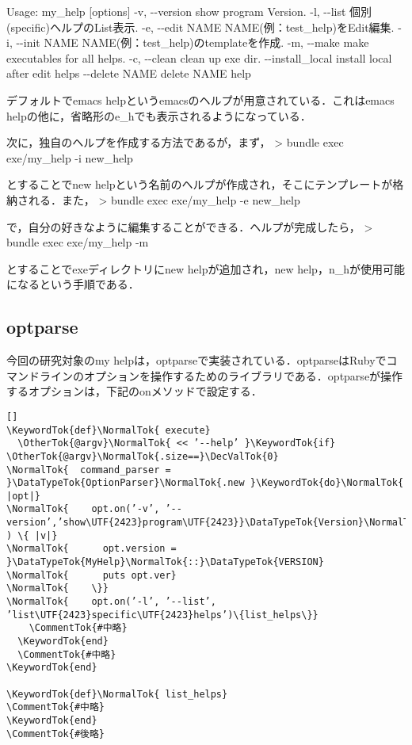 \documentclass[11pt,dvipdfmx]{jsarticle}
\newcommand{\KeywordTok}[1]{\textcolor[rgb]{0.00,0.44,0.13}{\textbf{{#1}}}}
\newcommand{\DataTypeTok}[1]{\textcolor[rgb]{0.56,0.13,0.00}{{#1}}}
\newcommand{\DecValTok}[1]{\textcolor[rgb]{0.25,0.63,0.44}{{#1}}}
\newcommand{\CommentTok}[1]{\textcolor[rgb]{0.38,0.63,0.69}{\textit{{#1}}}}
\newcommand{\OtherTok}[1]{\textcolor[rgb]{0.00,0.44,0.13}{{#1}}}
\newcommand{\NormalTok}[1]{{#1}}
\begin{document}
Usage: my\_help {[}options{]} -v, -\/-version show program Version. -l,
-\/-list 個別(specific)ヘルプのList表示. -e, -\/-edit NAME
NAME(例：test\_help)をEdit編集. -i, -\/-init NAME
NAME(例：test\_help)のtemplateを作成. -m, -\/-make make executables for
all helps. -c, -\/-clean clean up exe dir. -\/-install\_local install
local after edit helps -\/-delete NAME delete NAME help

デフォルトでemacs helpというemacsのヘルプが用意されている．これはemacs
helpの他に，省略形のe\_hでも表示されるようになっている．

次に，独自のヘルプを作成する方法であるが，まず， \textgreater{} bundle
exec exe/my\_help -i new\_help

とすることでnew
helpという名前のヘルプが作成され，そこにテンプレートが格納される．また，
\textgreater{} bundle exec exe/my\_help -e new\_help

で，自分の好きなように編集することができる．ヘルプが完成したら，
\textgreater{} bundle exec exe/my\_help -m

とすることでexeディレクトリにnew helpが追加され，new
help，n\_hが使用可能になるという手順である．

\subsection{optparse}\label{optparse}

今回の研究対象のmy
helpは，optparseで実装されている．optparseはRubyでコマンドラインのオプションを操作するためのライブラリである．optparseが操作するオプションは，下記のonメソッドで設定する．

\begin{screen}
{\small
\begin{verbatim}[]
\KeywordTok{def}\NormalTok{ execute}
  \OtherTok{@argv}\NormalTok{ << ’--help’ }\KeywordTok{if} \OtherTok{@argv}\NormalTok{.size==}\DecValTok{0}
\NormalTok{  command_parser = }\DataTypeTok{OptionParser}\NormalTok{.new }\KeywordTok{do}\NormalTok{ |opt|}
\NormalTok{    opt.on(’-v’, ’--version’,’show\UTF{2423}program\UTF{2423}}\DataTypeTok{Version}\NormalTok{.’ ) \{ |v|}
\NormalTok{      opt.version = }\DataTypeTok{MyHelp}\NormalTok{::}\DataTypeTok{VERSION}
\NormalTok{      puts opt.ver}
\NormalTok{    \}}
\NormalTok{    opt.on(’-l’, ’--list’, ’list\UTF{2423}specific\UTF{2423}helps’)\{list_helps\}}
    \CommentTok{#中略}
  \KeywordTok{end}
  \CommentTok{#中略}
\KeywordTok{end}
    
\KeywordTok{def}\NormalTok{ list_helps}
\CommentTok{#中略}
\KeywordTok{end}
\CommentTok{#後略}
\end{verbatim}}
\end{screen}
\end{document}
